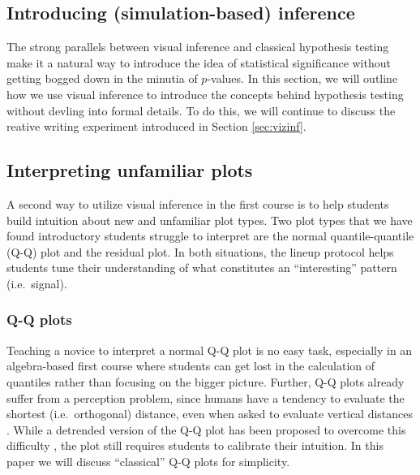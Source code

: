 \documentclass[12pt]{article}
\begin{document}
\hypertarget{introducing-simulation-based-inference}{%
\subsection{Introducing (simulation-based)
inference}\label{introducing-simulation-based-inference}}

The strong parallels between visual inference and classical hypothesis
testing make it a natural way to introduce the idea of statistical
significance without getting bogged down in the minutia of \(p\)-values.
In this section, we will outline how we use visual inference to
introduce the concepts behind hypothesis testing without devling into
formal details. To do this, we will continue to discuss the reative
writing experiment introduced in Section \ref{sec:vizinf}.

\hypertarget{interpreting-unfamiliar-plots}{%
\subsection{Interpreting unfamiliar
plots}\label{interpreting-unfamiliar-plots}}

A second way to utilize visual inference in the first course is to help
students build intuition about new and unfamiliar plot types. Two plot
types that we have found introductory students struggle to interpret are
the normal quantile-quantile (Q-Q) plot and the residual plot. In both
situations, the lineup protocol helps students tune their understanding
of what constitutes an ``interesting'' pattern (i.e.~signal).

\hypertarget{q-q-plots}{%
\subsubsection{Q-Q plots}\label{q-q-plots}}

Teaching a novice to interpret a normal Q-Q plot is no easy task,
especially in an algebra-based first course where students can get lost
in the calculation of quantiles rather than focusing on the bigger
picture. Further, Q-Q plots already suffer from a perception problem,
since humans have a tendency to evaluate the shortest (i.e.~orthogonal)
distance, even when asked to evaluate vertical distances
\citep{cleveland1984, robbins2005, sineillusion}. While a detrended
version of the Q-Q plot has been proposed to overcome this difficulty
\citep{Loy2016-fg}, the plot still requires students to calibrate their
intuition. In this paper we will discuss ``classical'' Q-Q plots for
simplicity.
\end{document}
